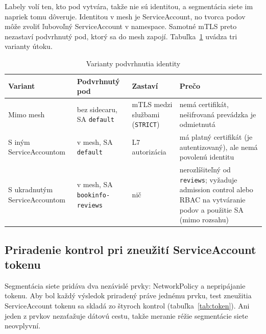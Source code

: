 Labely volí ten, kto pod vytvára, takže nie sú identitou, a segmentácia siete im napriek tomu dôveruje. Identitou v mesh je ServiceAccount, no tvorca podov môže zvoliť ľubovoľný ServiceAccount v namespace. Samotné mTLS preto nezastaví podvrhnutý pod, ktorý sa do mesh zapojí. Tabuľka~\ref{tab:spoofing} uvádza tri varianty útoku.

\begin{table}[ht!]
  \centering
  \caption{Varianty podvrhnutia identity}
  \label{tab:spoofing}
  \footnotesize
  \renewcommand{\arraystretch}{1.15}
  \begin{tabularx}{\textwidth}{@{}>{\raggedright\arraybackslash}p{2.6cm}>{\raggedright\arraybackslash}p{3.3cm}>{\raggedright\arraybackslash}p{2.4cm}>{\raggedright\arraybackslash}X@{}}
    \toprule
    Variant & Podvrhnutý pod & Zastaví & Prečo \\
    \midrule
    Mimo mesh & bez sidecaru, SA \texttt{default} & mTLS medzi službami (\texttt{STRICT}) & nemá certifikát, nešifrovaná prevádzka je odmietnutá \\
    S iným ServiceAccountom & v mesh, SA \texttt{default} & L7 autorizácia & má platný certifikát (je autentizovaný), ale nemá povolenú identitu \\
    S ukradnutým ServiceAccountom & v mesh, SA \texttt{bookinfo-reviews} & nič & nerozlíšiteľný od \texttt{reviews}; vyžaduje admission control alebo RBAC na vytváranie podov a použitie SA (mimo rozsahu) \\
    \bottomrule
  \end{tabularx}
\end{table}

\subsection{Priradenie kontrol pri zneužití ServiceAccount tokenu}

Segmentácia siete pridáva dva nezávislé prvky: NetworkPolicy a nepripájanie tokenu. Aby bol každý výsledok priradený práve jednému prvku, test zneužitia ServiceAccount tokenu sa skladá zo štyroch kontrol (tabuľka~\ref{tab:token}). Ani jeden z prvkov nezaťažuje dátovú cestu, takže meranie réžie segmentácie siete neovplyvní.

